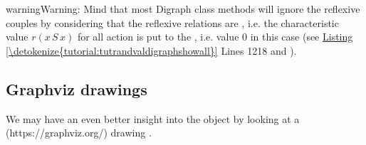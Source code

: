 \documentclass[a4paper,12pt,english]{sphinxhowto}
\begin{document}
\begin{sphinxVerbatim}[commandchars=\\\{\},numbers=left,firstnumber=1,stepnumber=1]
\end{sphinxVerbatim}

\begin{sphinxadmonition}{warning}{Warning:}
Mind that most Digraph class methods will ignore the reflexive couples by considering that the reflexive relations are , i.e. the characteristic value \(r(x\,S\,x)\) for all action  is put to the , i.e.  value 0 in this case (see \hyperref[\detokenize{tutorial:tutrandvaldigraphshowall}]{Listing \ref{\detokenize{tutorial:tutrandvaldigraphshowall}}} Lines 12\sphinxhyphen{}18 and ).
\end{sphinxadmonition}


\subsection{Graphviz drawings}
\label{\detokenize{tutorial:graphviz-drawings}}
We may have an even better insight into the  object  by looking at a  (https://graphviz.org/)  drawing \sphinxfootnotemark[1] .
\end{document}
